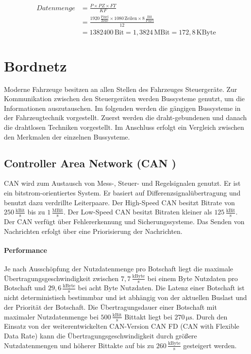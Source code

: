 \begin{align}
		Datenmenge &= \frac{P \times PZ \times FT}{KF} \label{eq:Bilddatenmenge}\\
		&= \frac{1920\,\frac{\mathrm{Pixel}}{\mathrm{Zeile}}\times 1080\,\mathrm{Zeilen} \times 8\,\frac{\mathrm{Bit}}{\mathrm{Pixel}}}{12} \\
		&= 1382400\,\mathrm{Bit} = 1,3824\,\mathrm{MBit} = 172,8\,\mathrm{KByte}
\end{align}
\section{Bordnetz}
Moderne Fahrzeuge besitzen an allen Stellen des Fahrzeuges Steuergeräte. Zur Kommunikation zwischen den Steuergeräten werden Bussysteme genutzt, um die Informationen auszutauschen.
Im folgenden werden die gängigen Bussysteme in der Fahrzeugtechnik vorgestellt.
Zuerst werden die draht-gebundenen und danach die drahtlosen Techniken vorgestellt. Im Anschluss erfolgt ein Vergleich zwischen den Merkmalen der einzelnen Bussysteme.
\subsection{Controller Area Network (CAN )}
CAN wird zum Austausch von Mess-, Steuer- und Regelsignalen genutzt. Er ist ein bitstrom-orientiertes System. Er basiert auf Differenzsignalübertragung und benutzt dazu verdrillte Leiterpaare.
Der High-Speed CAN besitzt Bitrate von $ 250\,\frac{\mathrm{kBit}}{\mathrm{s}} $ bis zu $ 1\,\frac{\mathrm{MBit}}{\mathrm{s}}$.
Der Low-Speed CAN besitzt Bitraten kleiner als $ 125\,\frac{\mathrm{kBit}}{\mathrm{s}} $. Der CAN verfügt über Fehlererkennung und Sicherungssysteme. Das Senden von Nachrichten erfolgt über eine Priorisierung der Nachrichten. \cite[Vgl. Seite 57 ff.]{Zimmermann.2014}
\paragraph{Performance}
Je nach Ausschöpfung der Nutzdatenmenge pro Botschaft liegt die maximale Übertragungsgeschwindigkeit zwischen $ 7,7\,\frac{\mathrm{kByte}}{\mathrm{s}} $ bei einem Byte Nutzdaten pro Botschaft und $ 29,6\,\frac{\mathrm{kByte}}{\mathrm{s}} $ bei acht Byte Nutzdaten. Die Latenz einer Botschaft ist nicht deterministisch bestimmbar und ist abhängig von der aktuellen Buslast und der Priorität der Botschaft. Die Übertragungsdauer einer Botschaft mit maximaler Nutzdatenmenge bei $ 500\,\frac{\mathrm{kBit}}{\mathrm{s}} $ Bittakt liegt bei $ 270\,\mathrm{\mu s}$.
Durch den Einsatz von der weiterentwickelten CAN-Version CAN FD (CAN with Flexible Data Rate) kann die Übertragungsgeschwindigkeit durch größere Nutzdatenmengen und höherer Bittakte auf bis zu $ 260\,\frac{\mathrm{kByte}}{\mathrm{s}} $ gesteigert werden. \cite[Vgl. Seite 76 ff.]{Zimmermann.2014}
